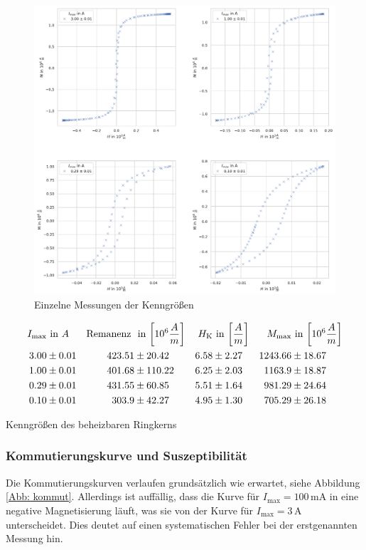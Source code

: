 \documentclass[12pt,a4paper]{scrartcl}
\numberwithin{equation}{section} %
\renewcommand{\[}{} %
\renewcommand{\]}{\noindent} %
\begin{document}
\begin{figure}
\centering
\includegraphics[scale=0.5]{../media/B2.4/3.3.1_single_measures.pdf}
\caption{Einzelne Messungen der Kenngrößen}
\label{Abb: heizbar kenngrößen}
\end{figure}

\begin{table}
	\begin{align*}
		I_\mathrm{max} &\text{ in } A &
		\text{Remanenz } &\text{ in }
		{\tiny \left[10^6  \frac{A}{m} \right] } &
		H_\mathrm{K} &\text{ in }
		{\tiny \left[ \frac{A}{m} \right] } &
		M_\mathrm{max} &\text{ in }
		{\tiny \left[10^6 \frac{A}{m} \right] }
		\\
		3.00 &\pm 0.01 &
		423.51 &\pm 20.42 &
		6.58 &\pm 2.27 &
		1243.66 &\pm 18.67
		\\
		1.00 &\pm 0.01 &
		401.68 &\pm 110.22 &
		6.25 &\pm 2.03 &
		1163.9 &\pm 18.87
		\\
		0.29 &\pm 0.01 &
		431.55 &\pm 60.85 &
		5.51 &\pm 1.64 &
		981.29 &\pm 24.64
		\\
		0.10 &\pm 0.01 &
		303.9 &\pm 42.27 &
		4.95 &\pm 1.30 &
		705.29 &\pm 26.18
	\end{align*}
	\caption{Kenngrößen des beheizbaren Ringkerns}
	\label{Tab: heizbar kenngrößen}
\end{table}

\hypertarget{kommutierungskurve-und-suszeptibilituxe4t}{%
\subsubsection{Kommutierungskurve und Suszeptibilität}\label{kommutierungskurve-und-suszeptibilituxe4t}}
Die Kommutierungskurven verlaufen grundsätzlich wie erwartet, siehe Abbildung \ref{Abb: kommut}. Allerdings ist auffällig, dass die Kurve für \(I_\mathrm{max}=100\mathrm{\,mA}\) in eine negative Magnetisierung läuft, was sie von der Kurve für \(I_\mathrm{max}= 3\,\mathrm A\) unterscheidet. Dies deutet auf einen systematischen Fehler bei der erstgenannten Messung hin.
\end{document}
